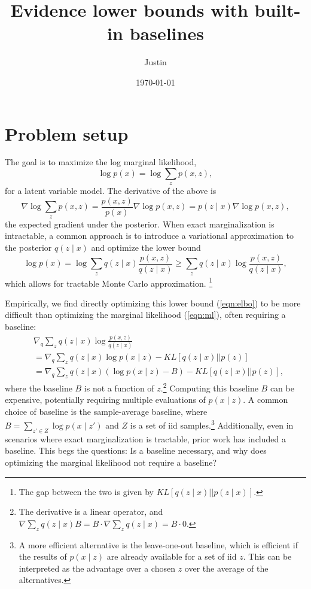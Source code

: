 \documentclass[12pt]{article}
\title{Evidence lower bounds with built-in baselines}
\author{Justin}
\date{\today}
\begin{document}
\maketitle

\section{Problem setup}
The goal is to maximize the log marginal likelihood,
\begin{equation}
\label{eqn:ml}
\log p(x) = \log \sum_z p(x,z),
\end{equation}
for a latent variable model.
The derivative of the above is 
\begin{equation}
\label{eqn:ml-grad}
\nabla \log \sum_z p(x,z)
= \frac{p(x,z)}{p(x)}\nabla \log p(x,z) = 
p(z\mid x)\nabla \log p(x,z),
\end{equation}
the expected gradient under the posterior.
When exact marginalization is intractable,
a common approach is to introduce a variational approximation to the posterior $q(z\mid x)$
and optimize the lower bound
\begin{equation}
\label{eqn:elbo}
\log p(x)
= \log \sum_z q(z\mid x) \frac{p(x,z)}{q(z\mid x)}
\ge \sum_z q(z\mid x) \log \frac{p(x,z)}{q(z\mid x)},
\end{equation}
which allows for tractable Monte Carlo approximation.
\footnote{
The gap between the two is given by $KL[q(z\mid x) || p(z \mid x)]$.
}

Empirically, we find directly optimizing this lower bound (\ref{eqn:elbo}) to be more difficult than
optimizing the marginal likelihood (\ref{eqn:ml}), often requiring a baseline:
\begin{equation}
\label{eqn:baseline}
\begin{aligned}
&\nabla_q \sum_z q(z\mid x) \log \frac{p(x,z)}{q(z\mid x)}\\
&= \nabla_q \sum_z q(z\mid x) \log p(x\mid z) - KL[q(z\mid x) || p(z)]\\
&= \nabla_q \sum_z q(z\mid x) (\log p(x\mid z) - B) - KL[q(z\mid x) || p(z)],
\end{aligned}
\end{equation}
where the baseline $B$ is not a function of $z$.\footnote{
The derivative is a linear operator, and
$\nabla\sum_z q(z\mid x)B = B\cdot\nabla \sum_z q(z\mid x) = B \cdot 0$.
}
Computing this baseline $B$ can be expensive,
potentially requiring multiple evaluations of $p(x\mid z)$.
A common choice of baseline is the sample-average baseline, where
$B = \sum_{z' \in Z} \log p(x\mid z')$
and $Z$ is a set of iid samples.\footnote{
A more efficient alternative is the leave-one-out baseline,
which is efficient if the results of $p(x\mid z)$ are already available
for a set of iid $z$.
This can be interpreted as the advantage over a chosen $z$ over the average
of the alternatives.
}
Additionally, even in scenarios where exact marginalization is tractable,
prior work has included a baseline. This begs the questions:
Is a baseline necessary, and why does optimizing the marginal likelihood
not require a baseline?
\end{document}
